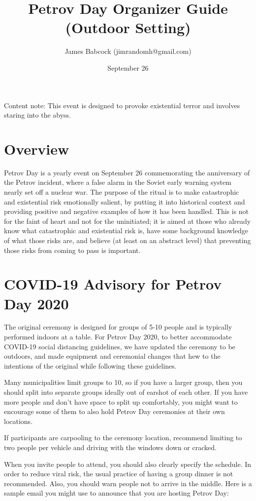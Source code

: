 \documentclass{article}
\title{Petrov Day Organizer Guide (Outdoor Setting)}
\author{James Babcock (jimrandomh@gmail.com)}
\date{September 26}
\begin{document}
\maketitle

Content note: This event is designed to provoke existential terror and involves
staring into the abyss.

\section{Overview}

Petrov Day is a yearly event on September 26 commemorating the anniversary of
the Petrov incident, where a false alarm in the Soviet early warning system
nearly set off a nuclear war. The purpose of the ritual is to make catastrophic
and existential risk emotionally salient, by putting it into historical context
and providing positive and negative examples of how it has been handled. This
is not for the faint of heart and not for the uninitiated; it is aimed at those
who already know what catastrophic and existential risk is, have some
background knowledge of what those risks are, and believe (at least on an
abstract level) that preventing those risks from coming to pass is important.

\section{COVID-19 Advisory for Petrov Day 2020}

The original ceremony is designed for groups of
5-10 people and is typically performed indoors at a table. For Petrov Day 2020, to better
accommodate COVID-19 social distancing guidelines, we have updated the ceremony
to be outdoors, and made equipment and ceremonial changes that hew to the
intentions of the original while following these guidelines.

Many municipalities limit groups to 10, so if you have a larger group, then
you should split into separate groups ideally out of earshot of each other. If
you have more people and don't have space to split up comfortably, you might
want to encourage some of them to also hold Petrov Day ceremonies at their own
locations.

If participants are carpooling to the ceremony location, recommend limiting to
two people per vehicle and driving with the windows down or cracked.

When you invite people to attend, you should also clearly specify the
schedule. In order to reduce viral risk, the usual practice of having a group dinner is not
recommended. Also, you should warn people not to arrive in the middle. Here is
a sample email you might use to announce that you are hosting Petrov Day:
\end{document}
